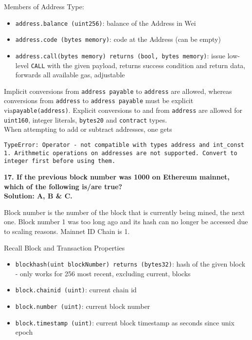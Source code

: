 Members of Address Type:

\begin{itemize}
    \item\verb|address.balance (uint256)|: balance of the Address in Wei
    \item\verb|address.code (bytes memory)|: code at the Address (can be empty)
    \item\verb|address.call(bytes memory) returns (bool, bytes memory)|: issue low-level \verb|CALL| with the given payload, returns success condition and return data, forwards all available gas, adjustable
\end{itemize}

Implicit conversions from \verb|address payable| to \verb|address| are allowed, whereas conversions from \verb|address| to \verb|address payable| must be explicit via\linebreak\verb|payable(address)|.
Explicit conversions to and from \verb|address| are allowed for \verb|uint160|, integer literals, \verb|bytes20| and \verb|contract| types.\\

When attempting to add or subtract addresses, one gets

\begin{lstlisting}[style=defaultStyle]
TypeError: Operator - not compatible with types address and int_const 1. Arithmetic operations on addresses are not supported. Convert to integer first before using them.
\end{lstlisting}

\pagebreak

\textbf{17. If the previous block number was 1000 on Ethereum mainnet, which of the following is/are true?}\label{sec:exam2_q17}\\

\textbf{Solution: A, B \& C.}

Block number is the number of the block that is currently being mined, the next one.
Block number 1 was too long ago and its hash can no longer be accessed due to scaling reasons.
Mainnet ID Chain is 1.

Recall Block and Transaction Properties
\begin{itemize}
    \item\verb|blockhash(uint blockNumber) returns (bytes32)|: hash of the given block - only works for 256 most recent, excluding current, blocks
    \item\verb|block.chainid (uint)|: current chain id
    \item\verb|block.number (uint)|: current block number
    \item\verb|block.timestamp (uint)|: current block timestamp as seconds since unix epoch
\end{itemize}

